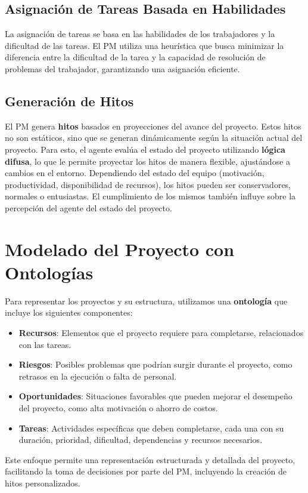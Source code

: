 \documentclass[a4paper, 12pt]{article}
\begin{document}
\subsection{Asignación de Tareas Basada en Habilidades}
La asignación de tareas se basa en las habilidades de los trabajadores y la dificultad de las tareas. El PM utiliza una heurística que busca minimizar la diferencia entre la dificultad de la tarea y la capacidad de resolución de problemas del trabajador, garantizando una asignación eficiente.

\subsection{Generación de Hitos}
El PM genera \textbf{hitos} basados en proyecciones del avance del proyecto. Estos hitos no son estáticos, sino que se generan dinámicamente según la situación actual del proyecto. Para esto, el agente evalúa el estado del proyecto utilizando \textbf{lógica difusa}, lo que le permite proyectar los hitos de manera flexible, ajustándose a cambios en el entorno. Dependiendo del estado del equipo (motivación, productividad, disponibilidad de recursos), los hitos pueden ser conservadores, normales o entusiastas. El cumplimiento de los mismos también influye sobre la percepción del agente del estado del proyecto.

\section{Modelado del Proyecto con Ontologías}
Para representar los proyectos y su estructura, utilizamos una \textbf{ontología} que incluye los siguientes componentes:
\begin{itemize}
    \item \textbf{Recursos}: Elementos que el proyecto requiere para completarse, relacionados con las tareas.
    \item \textbf{Riesgos}: Posibles problemas que podrían surgir durante el proyecto, como retrasos en la ejecución o falta de personal.
    \item \textbf{Oportunidades}: Situaciones favorables que pueden mejorar el desempeño del proyecto, como alta motivación o ahorro de costos.
    \item \textbf{Tareas}: Actividades específicas que deben completarse, cada una con su duración, prioridad, dificultad, dependencias y recursos necesarios.
\end{itemize}
Este enfoque permite una representación estructurada y detallada del proyecto, facilitando la toma de decisiones por parte del PM, incluyendo la creación de hitos personalizados.
\end{document}
